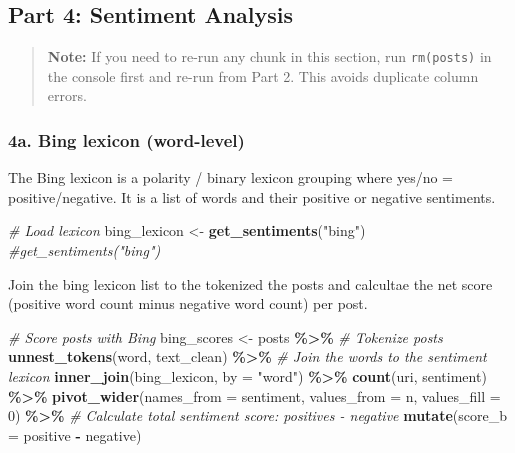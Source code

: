 \documentclass[
]{article}
\newenvironment{Shaded}{\begin{snugshade}}{\end{snugshade}}
\newcommand{\AttributeTok}[1]{\textcolor[rgb]{0.13,0.29,0.53}{#1}}
\newcommand{\CommentTok}[1]{\textcolor[rgb]{0.56,0.35,0.01}{\textit{#1}}}
\newcommand{\DecValTok}[1]{\textcolor[rgb]{0.00,0.00,0.81}{#1}}
\newcommand{\FunctionTok}[1]{\textcolor[rgb]{0.13,0.29,0.53}{\textbf{#1}}}
\newcommand{\NormalTok}[1]{#1}
\newcommand{\OtherTok}[1]{\textcolor[rgb]{0.56,0.35,0.01}{#1}}
\newcommand{\SpecialCharTok}[1]{\textcolor[rgb]{0.81,0.36,0.00}{\textbf{#1}}}
\newcommand{\StringTok}[1]{\textcolor[rgb]{0.31,0.60,0.02}{#1}}
\begin{document}
\subsection{Part 4: Sentiment Analysis}\label{part-4-sentiment-analysis}

\begin{quote}
\textbf{Note:} If you need to re-run any chunk in this section, run
\texttt{rm(posts)} in the console first and re-run from Part 2. This
avoids duplicate column errors.
\end{quote}

\subsubsection{4a. Bing lexicon
(word-level)}\label{a.-bing-lexicon-word-level}

The Bing lexicon is a polarity / binary lexicon grouping where yes/no =
positive/negative. It is a list of words and their positive or negative
sentiments.

\begin{Shaded}
\begin{Highlighting}[]
\CommentTok{\# Load lexicon }
\NormalTok{bing\_lexicon }\OtherTok{\textless{}{-}} \FunctionTok{get\_sentiments}\NormalTok{(}\StringTok{"bing"}\NormalTok{)}
\CommentTok{\#get\_sentiments("bing")}
\end{Highlighting}
\end{Shaded}

Join the bing lexicon list to the tokenized the posts and calcultae the
net score (positive word count minus negative word count) per post.

\begin{Shaded}
\begin{Highlighting}[]
\CommentTok{\# Score posts with Bing}
\NormalTok{bing\_scores }\OtherTok{\textless{}{-}}\NormalTok{ posts }\SpecialCharTok{\%\textgreater{}\%} 
  \CommentTok{\# Tokenize posts }
  \FunctionTok{unnest\_tokens}\NormalTok{(word, text\_clean) }\SpecialCharTok{\%\textgreater{}\%} 
  \CommentTok{\# Join the words to the sentiment lexicon }
  \FunctionTok{inner\_join}\NormalTok{(bing\_lexicon, }\AttributeTok{by =} \StringTok{"word"}\NormalTok{) }\SpecialCharTok{\%\textgreater{}\%} 
  \FunctionTok{count}\NormalTok{(uri, sentiment) }\SpecialCharTok{\%\textgreater{}\%} 
  \FunctionTok{pivot\_wider}\NormalTok{(}\AttributeTok{names\_from =}\NormalTok{ sentiment, }
              \AttributeTok{values\_from =}\NormalTok{ n, }
              \AttributeTok{values\_fill =} \DecValTok{0}\NormalTok{) }\SpecialCharTok{\%\textgreater{}\%} 
  \CommentTok{\# Calculate total sentiment score: positives {-} negative }
  \FunctionTok{mutate}\NormalTok{(}\AttributeTok{score\_b =}\NormalTok{ positive }\SpecialCharTok{{-}}\NormalTok{ negative) }
\end{Highlighting}
\end{Shaded}
\end{document}
